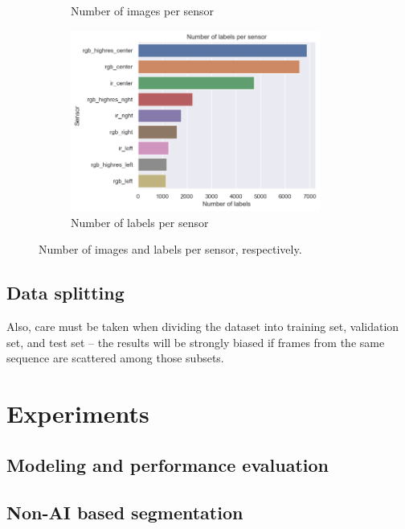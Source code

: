\documentclass[Master,MDS,english]{BASE/twbook} %
\begin{document}
\begin{figure}
\begin{subfigure}{.5\textwidth}
  \caption{Number of images per sensor}
  \label{fig:sub1}
\end{subfigure}%
\begin{subfigure}{.5\textwidth}
  \centering
  \includegraphics[width=0.9\textwidth]{images/datasets/db/labels_per_sensor}
  \caption{Number of labels per sensor}
  \label{fig:sub2}
\end{subfigure}
\caption{Number of images and labels per sensor, respectively.}
\label{fig:examples}
\end{figure}



\section{Data splitting}

Also, care must be taken when dividing the dataset into training set, validation set, and test set -- the results will be strongly biased if frames from the same sequence are scattered among those subsets.


\chapter{Experiments} %

\section{Modeling and performance evaluation} 



\section{Non-AI based segmentation}
\end{document}
